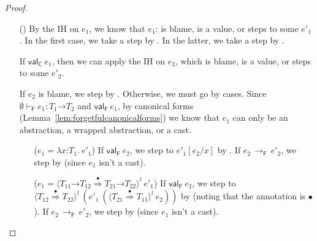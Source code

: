 \documentclass[9pt]{extarticle}
\newcommand{\ottnt}[1]{\mathit{#1}}
\newcommand{\ottsym}[1]{#1}
\begin{document}
{\begin{lemma}
\begin{proof}
{\begin{itemize}
    \item[(\T{App})] By the IH on $\ottnt{e_{{\mathrm{1}}}}$, we know that $\ottnt{e_{{\mathrm{1}}}}$: is
      blame, is a value, or steps to some $\ottnt{e'_{{\mathrm{1}}}}$. In the first
      case, we take a step by . In the latter, we take a
      step by .

      If $ \mathsf{val} _{  \mathsf{C}  }~ \ottnt{e_{{\mathrm{1}}}} $, then we can apply the IH on $\ottnt{e_{{\mathrm{2}}}}$, which is
      blame, is a value, or steps to some $\ottnt{e'_{{\mathrm{2}}}}$. 

      If $\ottnt{e_{{\mathrm{2}}}}$ is blame, we step by . Otherwise, we
      must go by cases. Since $ \emptyset   \vdash _{  \mathsf{F}  }  \ottnt{e_{{\mathrm{1}}}}  :   \ottnt{T_{{\mathrm{1}}}} \mathord{ \rightarrow } \ottnt{T_{{\mathrm{2}}}}  $ and $ \mathsf{val} _{  \mathsf{F}  }~ \ottnt{e_{{\mathrm{1}}}} $, by canonical forms
      (Lemma~\ref{lem:forgetfulcanonicalforms}) we know that $\ottnt{e_{{\mathrm{1}}}}$
      can only be an abstraction, a wrapped abstraction, or a cast.
\begin{itemize}
      \item[($\ottnt{e_{{\mathrm{1}}}}  \ottsym{=}   \lambda \mathit{x} \mathord{:} \ottnt{T_{{\mathrm{1}}}} .~  \ottnt{e'_{{\mathrm{1}}}} $)] If $ \mathsf{val} _{  \mathsf{F}  }~ \ottnt{e_{{\mathrm{2}}}} $, we step to
        $ \ottnt{e'_{{\mathrm{1}}}}  [  \ottnt{e_{{\mathrm{2}}}} / \mathit{x}  ] $ by . If $\ottnt{e_{{\mathrm{2}}}} \,  \longrightarrow _{  \mathsf{F}  }  \, \ottnt{e'_{{\mathrm{2}}}}$, we step by
         (since $\ottnt{e_{{\mathrm{1}}}}$ isn't a cast).

      \item[($\ottnt{e_{{\mathrm{1}}}}  \ottsym{=}   \langle   \ottnt{T_{{\mathrm{11}}}} \mathord{ \rightarrow } \ottnt{T_{{\mathrm{12}}}}   \mathord{ \overset{\bullet}{\Rightarrow} }   \ottnt{T_{{\mathrm{21}}}} \mathord{ \rightarrow } \ottnt{T_{{\mathrm{22}}}}   \rangle^{ \ottnt{l} } ~  \ottnt{e'_{{\mathrm{1}}}} $)] If $ \mathsf{val} _{  \mathsf{F}  }~ \ottnt{e_{{\mathrm{2}}}} $, we step to $ \langle  \ottnt{T_{{\mathrm{12}}}}  \mathord{ \overset{\bullet}{\Rightarrow} }  \ottnt{T_{{\mathrm{22}}}}  \rangle^{ \ottnt{l} } ~   (  \ottnt{e'_{{\mathrm{1}}}} ~  (  \langle  \ottnt{T_{{\mathrm{21}}}}  \mathord{ \overset{\bullet}{\Rightarrow} }  \ottnt{T_{{\mathrm{11}}}}  \rangle^{ \ottnt{l} } ~  \ottnt{e_{{\mathrm{2}}}}  )   )  $ by
         (noting that the annotation is $ \bullet $). If $\ottnt{e_{{\mathrm{2}}}} \,  \longrightarrow _{  \mathsf{F}  }  \, \ottnt{e'_{{\mathrm{2}}}}$, we step by  (since $\ottnt{e_{{\mathrm{1}}}}$ isn't a
        cast).
      \end{itemize}


\end{itemize}}
\end{proof}
\end{lemma}}
\end{document}
